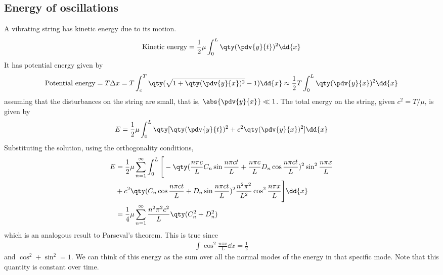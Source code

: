 \subsection{Energy of oscillations}
A vibrating string has kinetic energy due to its motion.
\begin{align*}
	\text{Kinetic energy} = \frac{1}{2} \mu \int_0^L \qty(\pdv{y}{t})^2 \dd{x}
\end{align*}
It has potential energy given by
\begin{align*}
	\text{Potential energy} = T \Delta x = T \int_c^T \qty(\sqrt{1 + \qty(\pdv{y}{x})^2}-1)\dd{x} \approx \frac{1}{2} T \int_0^L \qty(\pdv{y}{x})^2 \dd{x}
\end{align*}
assuming that the disturbances on the string are small, that is, $\abs{\pdv{y}{x}} \ll 1$.
The total energy on the string, given $c^2 = T/\mu$, is given by
\begin{align*}
	E = \frac{1}{2}\mu \int_0^L \qty[\qty(\pdv{y}{t})^2 + c^2 \qty(\pdv{y}{x})^2] \dd{x}
\end{align*}
Substituting the solution, using the orthogonality conditions,
\begin{align*}
	E & = \frac{1}{2}\mu \sum_{n=1}^\infty \int_0^L \Bigg[-\qty(\frac{n \pi c}{L} C_n \sin \frac{n \pi c t}{L} + \frac{n \pi c}{L} D_n \cos \frac{n \pi c t}{L})^2 \sin^2 \frac{n \pi x}{L} \\
	  & + c^2 \qty(C_n \cos \frac{n \pi c t}{L} + D_n \sin \frac{n \pi c t}{L})^2 \frac{n^2 \pi^2}{L^2} \cos^2 \frac{n \pi x}{L} \Bigg] \dd{x}                                              \\
	  & = \frac{1}{4} \mu \sum_{n=1}^\infty \frac{n^2 \pi^2 c^2}{L} \qty(C_n^2 + D_n^2)
\end{align*}
which is an analogous result to Parseval's theorem.
This is true since \begin{align*}
	\int \cos^2 \frac{n \pi x}{L}\dd{x} = \frac{1}{2}
\end{align*} and $\cos^2 + \sin^2 = 1$.
We can think of this energy as the sum over all the normal modes of the energy in that specific mode.
Note that this quantity is constant over time.

